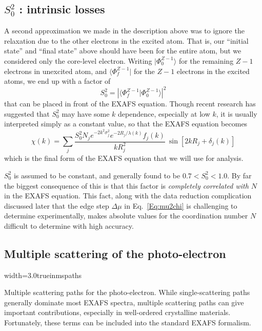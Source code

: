 \subsection{$S_0^2$ : intrinsic losses}

A second approximation we made in the description above was to ignore the
relaxation due to the other electrons in the excited atom.  That is, our
``initial state'' and ``final state'' above should have been for the entire
atom, but we considered only the core-level electron. Writing ${|
  \Phi^{Z-1}_0 \rangle }$ for the remaining $Z-1$ electrons in unexcited
atom, and ${\langle \Phi^{Z-1}_f|}$ for the $Z-1$ electrons in the excited
atoms, we end up with a factor of
\begin{equation}
  S_0^2 =  {  |{\langle \Phi^{Z-1}_f |\Phi^{Z-1}_0 \rangle}|^2}
  \label{Eq:S02}
\end{equation}
\noindent
that can be placed in front of the EXAFS equation.  Though recent research
has suggested that $S_0^2$ may have some $k$ dependence, especially at low
$k$, it is usually interpreted simply as a constant value, so that the
EXAFS equation becomes
\begin{equation}
  \chi(k) = \sum_j {
    {{\frac{S_0^2 N_j e^{-2k^2\sigma_j^2} e^{-2R_j/\lambda(k)}  f_j(k)}{kR_j^2}}}\>
    \sin[2kR_j + \delta_j(k)] }
  \label{Eq:xafs_withs02}
\end{equation}
\noindent
which is the final form of the EXAFS equation that we will use for
analysis.


$S_0^2$ is assumed to be constant, and generally found to be $ 0.7 < S_0^2
< 1.0 $.  By far the biggest consequence of this is that this factor is
{\emph{completely correlated with $N$}} in the EXAFS equation.  This fact,
along with the data reduction complication discussed later that the edge
step $\Delta\mu$ in Eq.~\ref{Eq:mu2chi} is challenging to determine
experimentally, makes absolute values for the coordination number $N$
difficult to determine with high accuracy.

\subsection{Multiple scattering of the photo-electron}

\begin{Nfig}{width=3.0truein}{mspaths}
  \caption{Multiple scattering paths for the photo-electron.  While
    single-scattering paths generally dominate most EXAFS spectra, multiple
    scattering paths can give important contributions, especially in
    well-ordered crystalline materials.  Fortunately, these terms can be
    included into the standard EXAFS formalism.}
  \label{Fig:THE:ms}
\end{Nfig}

